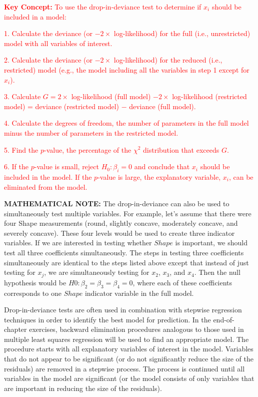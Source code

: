 \documentclass[
]{report}
\begin{document}
\Large

\textbf{\textcolor{red}{Key Concept:}}
\textcolor{red}{To use the drop-in-deviance test to determine if $x_i$ should be included in a model:}

\textcolor{red}{1. Calculate the deviance (or $-2 \times$ log-likelihood) for the full (i.e., unrestricted) model with all variables of interest.}

\textcolor{red}{2. Calculate the deviance (or $-2 \times$ log-likelihood) for the reduced (i.e., restricted) model (e.g., the model including all the variables in step 1 except for $x_i$).}

\textcolor{red}{3. Calculate $G = 2 \times$ log-likelihood (full model) $-2 \times$ log-likelihood (restricted model) = deviance (restricted model) $-$ deviance (full model).}

\textcolor{red}{4. Calculate the degrees of freedom, the number of parameters in the full model minus the number of parameters in the restricted model.}

\textcolor{red}{5. Find the $p$-value, the percentage of the $\chi^2$ distribution that exceeds $G$.}

\textcolor{red}{6. If the $p$-value is small, reject $H_0: \beta_i = 0$ and conclude that $x_i$ should be included in the model. If the $p$-value is large, the explanatory variable, $x_i$, can be eliminated from the model.}
\normalsize

\large

\textbf{MATHEMATICAL NOTE:}
The drop-in-deviance can also be used to simultaneously test multiple variables. For example, let's assume
that there were four Shape measurements (round, slightly concave, moderately concave, and severely
concave). These four levels would be used to create three indicator variables. If we are interested in
testing whether \(Shape\) is important, we should test all three coefficients simultaneously. The steps in
testing three coefficients simultaneously are identical to the steps listed above except that instead of
just testing for \(x_j\), we are simultaneously testing for \(x_2\), \(x_3\), and \(x_4\). Then the null hypothesis would be
\(H0: \beta_2 = \beta_3 = \beta_4 = 0\), where each of these coefficients corresponds to one \(Shape\) indicator variable
in the full model.
\normalsize 

Drop-in-deviance tests are often used in combination with stepwise regression techniques in order to
identify the best model for prediction. In the end-of-chapter exercises, backward elimination procedures
analogous to those used in multiple least squares regression will be used to find an appropriate model. The
procedure starts with all explanatory variables of interest in the model. Variables that do not appear to be
significant (or do not significantly reduce the size of the residuals) are removed in a stepwise process. The
process is continued until all variables in the model are significant (or the model consists of only variables
that are important in reducing the size of the residuals).
\end{document}
